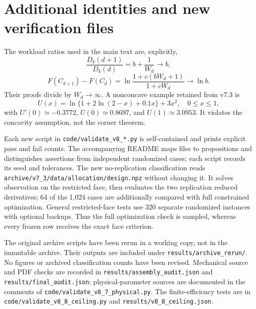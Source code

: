 \section{Additional identities and new verification files}
\label{supp:newchecks}
The workload ratios used in the main text are, explicitly,
\begin{equation}
 \frac{D_k(d+1)}{D_k(d)}=b+\frac1{W_d}\longrightarrow b,
 \label{eq:recursion-cost}
\end{equation}
\begin{equation}
 F(C_{d+1})-F(C_d)=\ln\frac{1+c(bW_d+1)}{1+cW_d}\longrightarrow\ln b.
 \label{eq:recursion-value}
\end{equation}
Their proofs divide by $W_d\to\infty$. A nonconcave example retained from
v7.3 is
\begin{equation}
 U(x)=\ln\{1+2\ln(2-x)+0.1x\}+3x^2,\quad 0\leq x\leq1,
 \label{eq:nonconcave}
\end{equation}
with $U'(0)\simeq-0.3772$, $U(0)\simeq0.8697$, and
$U(1)\simeq3.0953$. It violates the concavity assumption, not the corner theorem.

Each new script in \texttt{code/validate\_v8\_*.py} is self-contained and
prints explicit pass and fail counts. The accompanying README maps files
to propositions and distinguishes assertions from independent randomized
cases; each script records its seed and tolerances. The new no-replication classification reads
\texttt{archive/v7\_3/data/allocation/design.npz} without changing it.
It solves observation on the restricted face, then evaluates the two
replication reduced derivatives; 64 of the 1,024 cases are additionally
compared with full constrained optimization. General restricted-face tests
use 320 separate randomized instances with optional backups. Thus the full
optimization check is sampled, whereas every frozen row receives the exact
face criterion.

The original archive scripts have been rerun in a working copy, not in the
immutable archive. Their outputs are included under
\texttt{results/archive\_rerun/}. No figures or archived classification
counts have been revised. Mechanical source and PDF checks are recorded in
\texttt{results/assembly\_audit.json} and
\texttt{results/final\_audit.json}; physical-parameter sources are documented
in the comments of \texttt{code/validate\_v8\_7\_physical.py}.
The finite-efficiency tests are in \texttt{code/validate\_v8\_8\_ceiling.py}
and \texttt{results/v8\_8\_ceiling.json}.
